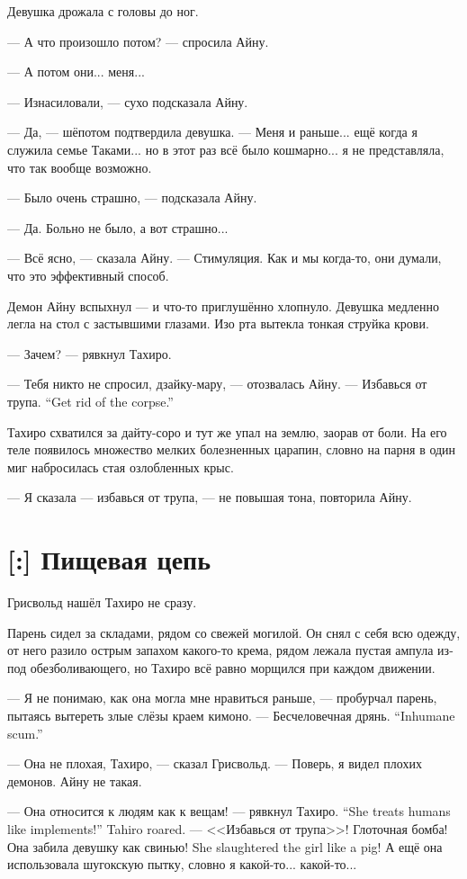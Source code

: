 \textspace

Девушка дрожала с головы до ног.

--- А что произошло потом? --- спросила Айну.

--- А потом они... меня...

--- Изнасиловали, --- сухо подсказала Айну.

--- Да, --- шёпотом подтвердила девушка.
--- Меня и раньше... ещё когда я служила семье Таками... но в этот раз всё было кошмарно... я не представляла, что так вообще возможно.

--- Было очень страшно, --- подсказала Айну.

--- Да.
Больно не было, а вот страшно...

--- Всё ясно, --- сказала Айну.
--- Стимуляция.
Как и мы когда-то, они думали, что это эффективный способ.

Демон Айну вспыхнул --- и что-то приглушённо хлопнуло.
Девушка медленно легла на стол с застывшими глазами.
Изо рта вытекла тонкая струйка крови.

--- Зачем? --- рявкнул Тахиро.

--- Тебя никто не спросил, дзайку-мару, --- отозвалась Айну.
{--- Избавься от трупа.}
{``Get rid of the corpse.''}

Тахиро схватился за дайту-соро и тут же упал на землю, заорав от боли.
На его теле появилось множество мелких болезненных царапин, словно на парня в один миг набросилась стая озлобленных крыс.

--- Я сказала --- избавься от трупа, --- не повышая тона, повторила Айну.

\section{[:] Пищевая цепь}

Грисвольд нашёл Тахиро не сразу.

Парень сидел за складами, рядом со свежей могилой.
Он снял с себя всю одежду, от него разило острым запахом какого-то крема, рядом лежала пустая ампула из-под обезболивающего, но Тахиро всё равно морщился при каждом движении.

--- Я не понимаю, как она могла мне нравиться раньше, --- пробурчал парень, пытаясь вытереть злые слёзы краем кимоно.
{--- Бесчеловечная дрянь.}
{``Inhumane scum.''}

--- Она не плохая, Тахиро, --- сказал Грисвольд.
--- Поверь, я видел плохих демонов.
Айну не такая.

{--- Она относится к людям как к вещам! --- рявкнул Тахиро.}
{``She treats humans like implements!'' Tahiro roared.}
--- <<Избавься от трупа>>!
Глоточная бомба!
{Она забила девушку как свинью!}
{She slaughtered the girl like a pig!}
А ещё она использовала шугокскую пытку\FM, словно я какой-то... какой-то...

